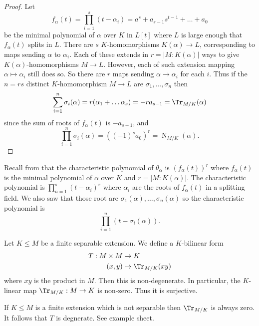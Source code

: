 \documentclass[a4paper]{article}
\DeclareMathOperator{\n}{N}
\begin{document}
\begin{proof}
  Let
  \[
    f_\alpha(t) = \prod_{i = 1}^{s} (t - \alpha_i) = a^s + a_{s - 1}s^{t - 1} + \dots + a_0
  \]
  be the minimal polynomial of \(\alpha\) over \(K\) in \(L[t]\) where \(L\) is large enough that \(f_\alpha(t)\) splits in \(L\). There are \(s\) \(K\)-homomorphisms \(K(\alpha) \to L\), corresponding to maps sending \(\alpha\) to \(\alpha_i\). Each of these extends in \(r = |M:K(\alpha)|\) ways to give \(K(\alpha)\)-homomorphisms \(M \to L\). However, each of such extension mapping \(\alpha \mapsto \alpha_i\) still does so. So there are \(r\) maps sending \(\alpha \to \alpha_i\) for each \(i\). Thus if the \(n = rs\) distinct \(K\)-homomorphism \(M \to L\) are \(\sigma_1, \dots, \sigma_n\) then
  \[
    \sum_{i = 1}^{n} \sigma_i(\alpha) = r(\alpha_1 + \dots \alpha_s) = -ra_{s - 1} = \Tr_{M/K} (\alpha)
  \]
  since the sum of roots of \(f_\alpha(t)\) is \(-a_{s - 1}\), and
  \[
    \prod_{i = 1}^{n} \sigma_i(\alpha) = ((-1)^s a_0)^r = \n_{M/K}(\alpha).
  \]
\end{proof}

%
%
%
%
%
Recall from  that the characteristic polynomial of \(\theta_\alpha\) is \((f_\alpha(t))^r\) where \(f_\alpha(t)\) is the minimal polynomial of \(\alpha\) over \(K\) and \(r = |M:K(\alpha)|\). The characteristic polynomial is \(\prod_{n = 1}^{s} (t - \alpha_i)^r\) where \(\alpha_i\) are the roots of \(f_\alpha(t)\) in a splitting field. We also saw that those root are \(\sigma_1(\alpha), \dots, \sigma_n(\alpha)\) so the characteristic polynomial is
\[
  \prod_{i = 1}^{n} (t - \sigma_i(\alpha)).
\]

\begin{theorem}
  \label{thm:vandermonde}
  Let \(K \leq M\) be a finite separable extension. We define a \(K\)-bilinear form
  \begin{align*}
    T: M \times M &\to K \\
    (x, y) &\mapsto \Tr_{M/K}(xy)
  \end{align*}
  where \(xy\) is the product in \(M\). Then this is non-degenerate. In particular, the \(K\)-linear map \(\Tr_{M/K}: M \to K\) is non-zero. Thus it is surjective.
\end{theorem}

\begin{remark}
  If \(K \leq M\) is a finite extension which is not separable then \(\Tr_{M/K}\) is always zero. It follows that \(T\) is degnerate. See example sheet.
\end{remark}
\end{document}
